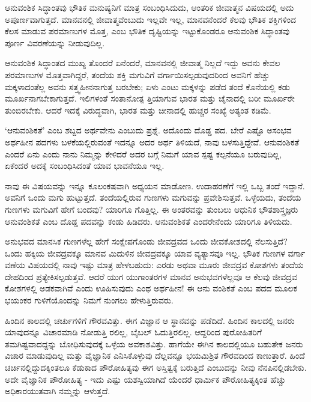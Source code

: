 ಆನುವಂಶಿಕ ಸಿದ್ಧಾಂತವು ಭೌತಿಕ ಮನುಷ್ಯನಿಗೆ ಮಾತ್ರ ಸಂಬಂಧಿಸಿದುದು, ಆಂತರಿಕ ಜೀವಾತ್ಮನ ವಿಷಯದಲ್ಲಿ ಅದು ಅಪೂರ್ಣವಾಗುತ್ತದೆ. ಮಾನವನಲ್ಲಿ ಜೀವಾತ್ಮವೆಂಬುದು ಇಲ್ಲವೇ ಇಲ್ಲ, ಮಾನವನೆಂದರೆ ಕೆಲವು ಭೌತಿಕ ಶಕ್ತಿಗಳಿಂದ ಕೆಲಸ ಮಾಡುವ ಪರಮಾಣುಗಳ ಮೊತ್ತ, ಎಂಬ ಭೌತಿಕ ದೃಷ್ಟಿಯನ್ನು ಇಟ್ಟುಕೊಂಡರೂ ಆನುವಂಶಿಕ ಸಿದ್ಧಾಂತವು ಪೂರ್ಣ ವಿವರಣೆಯನ್ನು ನೀಡುವುದಿಲ್ಲ.

ಆನುವಂಶಿಕ ಸಿದ್ಧಾಂತದ ಮುಖ್ಯ ತೊಂದರೆ ಏನೆಂದರೆ, ಮಾನವನಲ್ಲಿ ಜೀವಾತ್ಮ ನಿಲ್ಲದೆ ಇದ್ದು ಅವನು ಕೇವಲ ಪರಮಾಣುಗಳ ಮೊತ್ತವಾಗಿದ್ದರೆ, ತಂದೆಯ ಶಕ್ತಿ ಮಗುವಿಗೆ ವರ್ಗಾಯಿಸಲ್ಪಡುವುದರಿಂದ ಅವನಿಗೆ ಹೆಚ್ಚು ಮಕ್ಕಳಾದಂತೆಲ್ಲ ಅವನು ಸತ್ತ್ವಹೀನನಾಗುತ್ತ ಬರಬೇಕು; ಏಳು ಎಂಟು ಮಕ್ಕಳನ್ನು ಪಡೆದ ತಂದೆ ಕೊನೆಯಲ್ಲಿ ಕಡು ಮೂರ್ಖನಾಗಬೇಕಾಗುತ್ತದೆ. ಇಲಿಗಳಂತೆ ಸಂತಾನೋತ್ಪ ತ್ತಿಯಾಗುವ ಭಾರತ ಮತ್ತು ಚೈನಾದಲ್ಲಿ ಬರೀ ಮೂರ್ಖರೇ ತುಂಬಿರಬೇಕು. ಆದರೆ ಇದಕ್ಕೆ ವಿರುದ್ಧವಾಗಿ, ಭಾರತ ಮತ್ತು ಚೀನಾದಲ್ಲಿ ಹುಚ್ಚರ ಸಂಖ್ಯೆ ಅತ್ಯಂತ ಕಡಿಮೆ.

‘ಆನುವಂಶಿಕತೆ’ ಎಂಬ ಶಬ್ದದ ಅರ್ಥವೇನು ಎಂಬುದು ಪ್ರಶ್ನೆ. ಅದೊಂದು ದೊಡ್ಡ ಪದ. ಬೇರೆ ಎಷ್ಟೊ ಅಸಂಭವ ಅರ್ಥಹೀನ ಪದಗಳು ಬಳಕೆಯಲ್ಲಿರುವಂತೆ ಇದನ್ನೂ ಅದರ ಅರ್ಥ ತಿಳಿಯದೆ, ನಾವು ಬಳಸುತ್ತಿದ್ದೇವೆ. ಆನುವಂಶಿಕತೆ ಎಂದರೆ ಏನು ಎಂದು ನಾನು ನಿಮ್ಮನ್ನು ಕೇಳಿದರೆ ಅದರ ಬಗ್ಗೆ ನಿಮಗೆ ಯಾವ ಸ್ಪಷ್ಟ ಕಲ್ಪನೆಯೂ ಬರುವುದಿಲ್ಲ, ಏಕೆಂದರೆ ಅದಕ್ಕೆ ಸಂಬಂಧಿಸಿದಂತೆ ಯಾವ ಭಾವನೆಯೂ ಇಲ್ಲ.

ನಾವು ಈ ವಿಷಯವನ್ನು ಇನ್ನೂ ಕೂಲಂಕಷವಾಗಿ ಅಧ್ಯಯನ ಮಾಡೋಣ. ಉದಾಹರಣೆಗೆ ಇಲ್ಲಿ ಒಬ್ಬ ತಂದೆ ಇದ್ದಾನೆ. ಅವನಿಗೆ ಒಂದು ಮಗು ಹುಟ್ಟುತ್ತದೆ. ತಂದೆಯಲ್ಲಿರುವ ಗುಣಗಳು ಮಗುವನ್ನು ಪ್ರವೇಶಿಸುತ್ತವೆ. ಒಳ್ಳೆಯದು, ತಂದೆಯ ಗುಣಗಳು ಮಗುವಿಗೆ ಹೇಗೆ ಬಂದವು? ಯಾರಿಗೂ ಗೊತ್ತಿಲ್ಲ. ಈ ಅಂತರವನ್ನು ತುಂಬಲು ಆಧುನಿಕ ಭೌತಶಾಸ್ತ್ರಜ್ಞರು ಆನುವಂಶಿಕತೆ ಎಂಬ ದೊಡ್ಡ ಪದವನ್ನು ಕಂಡು ಹಿಡಿದರು. ಆನುವಂಶಿಕತೆ ಎಂದರೇನೆಂದು ಯಾರಿಗೂ ತಿಳಿಯದು.

ಅನುಭವದ ಮಾನಸಿಕ ಗುಣಗಳೆಲ್ಲ ಹೇಗೆ ಸಂಕ್ಷೇಪಗೊಂಡು ಜೀವದ್ರವದ ಒಂದು ಜೀವಕೋಶದಲ್ಲಿ ನೆಲಸುತ್ತಿದೆ? ಒಂದು ಹಕ್ಕಿಯ ಜೀವದ್ರವಕ್ಕೂ ಮಾನವ ಮಿದುಳಿನ ಜೀವದ್ರವಕ್ಕೂ ಯಾವ ವ್ಯತ್ಯಾಸವೂ ಇಲ್ಲ. ಭೌತಿಕ ಗುಣಗಳ ವರ್ಗಾ ವಣೆಯ ವಿಷಯದಲ್ಲಿ ನಾವು ಇಷ್ಟು ಮಾತ್ರ ಹೇಳಬಹುದು: ಎರಡು ಅಥವಾ ಮೂರು ಜೀವದ್ರವ ಕೋಶಗಳು ತಂದೆಯ ದೇಹದಿಂದ ಪ್ರತ್ಯೇಕಿಸಲ್ಪಡುತ್ತವೆ. ಆದರೆ ಯುಗ ಯುಗಾಂತರಗಳ ಮಾನವ ಅನುಭವಗಳೆಲ್ಲವೂ ಆ ಕೆಲವು ಜೀವದ್ರವ ಕೋಶಗಳಲ್ಲಿ ಅಡಕವಾಗಿವೆ ಎಂದು ಊಹಿಸುವುದು ಎಂಥ ಅರ್ಥಹೀನ! ಈ ಆನು ವಂಶಿಕತೆ ಎಂಬ ಪದದ ಮೂಲಕ ಭಯಂಕರ ಗುಳಿಗೆಯೊಂದನ್ನು ನಿಮಗೆ ನುಂಗಲು ಹೇಳುತ್ತಿರುವರು.

ಹಿಂದಿನ ಕಾಲದಲ್ಲಿ ಚರ್ಚುಗಳಿಗೆ ಗೌರವವಿತ್ತು. ಈಗ ವಿಜ್ಞಾನ ಆ ಸ್ಥಾನವನ್ನು ಪಡೆದಿದೆ. ಹಿಂದಿನ ಕಾಲದಲ್ಲಿ ಜನರು ಯಾವುದನ್ನೂ ವಿಚಾರಮಾಡಿ ನೋಡುತ್ತಿ ರಲಿಲ್ಲ, ಬೈಬಲ್ ಓದುತ್ತಿರಲಿಲ್ಲ. ಆದ್ದರಿಂದ ಪುರೋಹಿತರಿಗೆ ತಮಗಿಷ್ಟವಾದದ್ದನ್ನು ಬೋಧಿಸುವುದಕ್ಕೆ ಒಳ್ಳೆಯ ಅವಕಾಶವಿತ್ತು. ಹಾಗೆಯೇ ಈಗಿನ ಕಾಲದಲ್ಲಿಯೂ ಬಹುತೇಕ ಜನರು ವಿಚಾರ ಮಾಡುವುದಿಲ್ಲ ಮತ್ತು ವೈಜ್ಞಾನಿಕ ಎನಿಸಿಕೊಳ್ಳುವು ದೆಲ್ಲವನ್ನೂ ಭಯಮಿಶ್ರಿತ ಗೌರವದಿಂದ ಕಾಣುತ್ತಾರೆ. ಹಿಂದೆ ಚರ್ಚಿನಲ್ಲಿದ್ದುದಕ್ಕಿಂತಲೂ ಕೆಡುಕಾದ ಪೌರೋಹಿತ್ಯವು ಈಗ ಅಸ್ತಿತ್ವಕ್ಕೆ ಬರುತ್ತಿದೆ ಎಂಬುದನ್ನು ನೀವು ನೆನಪಿನಲ್ಲಿಡಬೇಕು. ಅದೇ ವೈಜ್ಞಾನಿಕ ಪೌರೋಹಿತ್ಯ - ಇದು ಎಷ್ಟು ಯಶಸ್ವಿಯಾಗಿದೆ ಯೆಂದರೆ ಧಾರ್ಮಿಕ ಪೌರೋಹಿತ್ಯಕ್ಕಿಂತ ಹೆಚ್ಚು ಅಧಿಕಾರಯುತವಾಗಿ ನಮ್ಮನ್ನು ಆಳುತ್ತದೆ.

